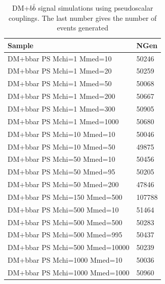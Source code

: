\begin{table}[]
\centering
\begin{tabular}{ll}
\hline \hline
Sample & NGen \\ \hline
DM+bbar PS  Mchi=1 Mmed=10  & 50246 \\
DM+bbar PS  Mchi=1 Mmed=20  & 50259 \\
DM+bbar PS  Mchi=1 Mmed=50  & 50068 \\
DM+bbar PS  Mchi=1 Mmed=200 &  50667 \\
DM+bbar PS  Mchi=1 Mmed=300 &  50905 \\
DM+bbar PS  Mchi=1 Mmed=1000 &  50680 \\
DM+bbar PS  Mchi=10 Mmed=10  & 50046 \\
DM+bbar PS  Mchi=10 Mmed=50  & 49875 \\
DM+bbar PS  Mchi=50 Mmed=10  & 50456 \\
DM+bbar PS  Mchi=50 Mmed=95  & 50205 \\
DM+bbar PS  Mchi=50 Mmed=200 &  47846 \\
DM+bbar PS  Mchi=150 Mmed=500 & 107788 \\
DM+bbar PS  Mchi=500 Mmed=10  & 51464 \\
DM+bbar PS  Mchi=500 Mmed=500 &  50283 \\
DM+bbar PS  Mchi=500 Mmed=995 &  50437 \\
DM+bbar PS  Mchi=500 Mmed=10000 &  50239 \\
DM+bbar PS  Mchi=1000 Mmed=10  & 50036 \\
DM+bbar PS  Mchi=1000 Mmed=1000 &  50960 \\
\hline \hline
\end{tabular}
\caption{DM+$b\bar{b}$ signal simulations using pseudoscalar couplings. The last number gives the number of events generated}
\label{tab:dmbb_ps}
\end{table}


